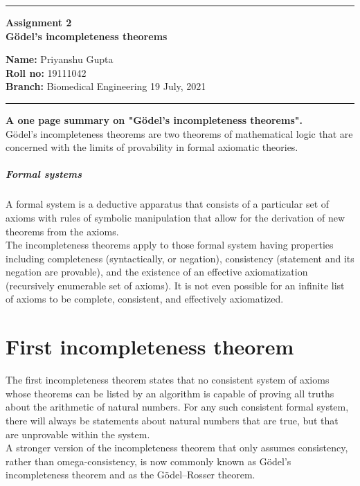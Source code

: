\documentclass[10pt,a4paper,twoside]{article}
\begin{document}
\begin{center}
\hrule

\vspace{.3cm}
{\bf {\Large Assignment 2 }}\\
{\bf {\huge Gödel's incompleteness theorems}}
\vspace{.2cm}
\end{center}
{\bf Name:}  Priyanshu Gupta\\
{\bf Roll no:}  19111042 \\
{\bf Branch: }  Biomedical Engineering \hspace{\fill}  19 July, 2021 \\
\hrule

\vspace{.4cm}
{\textbf{\large A one page summary on "Gödel's incompleteness theorems".}} \\

Gödel's incompleteness theorems are two theorems of mathematical logic that are concerned with the limits of provability in formal axiomatic theories. 

\subparagraph{Formal systems}
A formal system is a deductive apparatus that consists of a particular set of axioms with rules of symbolic manipulation that allow for the derivation of new theorems from the axioms. \\
The incompleteness theorems apply to those formal system having properties including completeness (syntactically, or negation), consistency (statement and its negation are provable), and the existence of an effective axiomatization (recursively enumerable set of axioms). It is not even possible for an infinite list of axioms to be complete, consistent, and effectively axiomatized.

\section{First incompleteness theorem}
The first incompleteness theorem states that no consistent system of axioms whose theorems can be listed by an algorithm is capable of proving all truths about the arithmetic of natural numbers. For any such consistent formal system, there will always be statements about natural numbers that are true, but that are unprovable within the system.\\
A stronger version of the incompleteness theorem that only assumes consistency, rather than omega-consistency, is now commonly known as Gödel's incompleteness theorem and as the Gödel–Rosser theorem.
\end{document}
